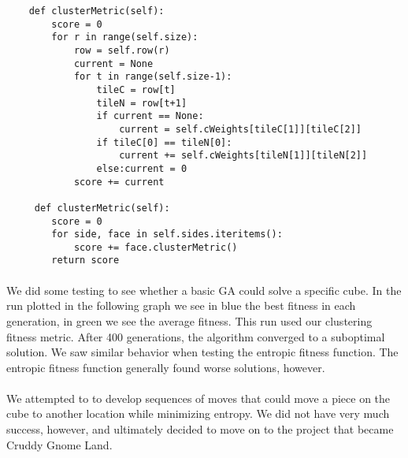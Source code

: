 \documentclass[12]{article}
\begin{document}
\begin{lstlisting}
    def clusterMetric(self):
        score = 0
        for r in range(self.size):
            row = self.row(r)
            current = None
            for t in range(self.size-1):
                tileC = row[t]
                tileN = row[t+1]
                if current == None:
                    current = self.cWeights[tileC[1]][tileC[2]]
                if tileC[0] == tileN[0]:
                    current += self.cWeights[tileN[1]][tileN[2]]
                else:current = 0
            score += current
            
     def clusterMetric(self):
        score = 0
        for side, face in self.sides.iteritems():
            score += face.clusterMetric()
        return score
\end{lstlisting}


\paragraph{} We did some testing to see whether a basic GA could solve a specific cube. In the run plotted in the following graph we see in blue the best fitness in each generation, in green we see the average fitness. This run used our clustering fitness metric. After 400 generations, the algorithm converged to a suboptimal solution. We saw similar behavior when testing the entropic fitness function. The entropic fitness function generally found worse solutions, however. 

\begin{center}
\end{center}
\paragraph{}
We attempted to to develop sequences of moves that could move a piece on the cube to another location while minimizing entropy. We did not have very much success, however, and ultimately decided to move on to the project that became Cruddy Gnome Land.
\end{document}
